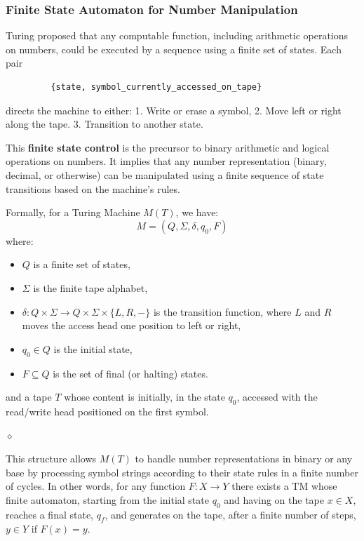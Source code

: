 \subsubsection{Finite State Automaton for Number Manipulation}

Turing proposed that any computable function, including arithmetic operations on numbers, could be executed by a sequence using a finite set of states. Each pair 
\begin{verbatim} 
         {state, symbol_currently_accessed_on_tape} 
\end{verbatim} 
directs the machine to either:
1. Write or erase a symbol, 
2. Move left or right along the tape.
3. Transition to another state.

This \textbf{finite state control} is the precursor to binary arithmetic and logical operations on numbers. It implies that any number representation (binary, decimal, or otherwise) can be manipulated using a finite sequence of state transitions based on the machine's rules.

\begin{definition}
Formally, for a Turing Machine \( M(T) \), we have:
\[
M = (Q, \Sigma, \delta, q_0, F)
\]
where:
\begin{itemize}
    \item \( Q \) is a finite set of states,
    \item \( \Sigma \) is the finite tape alphabet,
    \item \( \delta: Q \times \Sigma \to Q \times \Sigma \times \{L, R, -\} \) is the transition function, where $L$ and $R$ moves the access head one position to left or right,
    \item \( q_0 \in Q \) is the initial state,
    \item \( F \subseteq Q \) is the set of final (or halting) states.
\end{itemize}
and a tape $T$ whose content is initially, in the state $q_0$,  accessed with the read/write head positioned on the first symbol.

$\diamond$
\end{definition}
This structure allows \( M(T) \) to handle number representations in binary or any base by processing symbol strings according to their state rules in a finite number of cycles. In other words, for any function $F: X \rightarrow Y$ there exists a TM whose finite automaton, starting from the initial state $q_0$ and having on the tape $x \in X$, reaches a final state, $q_f$, and generates on the tape, after a finite number of steps, $y \in Y$ if $F(x) = y$.

